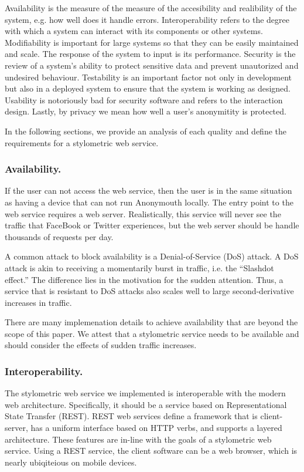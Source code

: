 \documentclass[letterpaper]{article}
\begin{document}
Availability is the measure of the measure of the accesibility and
realibility of the system, e.g. how well does it handle errors.
Interoperability refers to the degree with which a system can interact
with its components or other systems.  Modifiability is important for
large systems so that they can be easily maintained and scale.  The
response of the system to input is its performance.  Security is the
review of a system's ability to protect sensitive data and prevent
unautorized and undesired behaviour.  Testability is an important
factor not only in development but also in a deployed system to ensure
that the system is working as designed.  Usability is notoriously bad
for security software \cite{Whitten:1999:WJC:1251421.1251435} and
refers to the interaction design.  Lastly, by privacy we mean how well
a user's anonymitity is protected.

In the following sections, we provide an analysis of each quality and
define the requirements for a stylometric web service.


\subsubsection{Availability.}

If the user can not access the web service, then the user is in the
same situation as having a device that can not run Anonymouth
locally.  The entry point to the web service requires a web server.
Realistically, this service will never see the traffic that FaceBook
or Twitter experiences, but the web server should be handle thousands
of requests per day.

A common attack to block availability is a Denial-of-Service (DoS)
attack.  A DoS attack is akin to receiving a momentarily burst in
traffic, i.e. the ``Slashdot effect.''  The difference lies in the
motivation for the sudden attention.  Thus, a service that is
resistant to DoS attacks also scales well to large second-derivative
increases in traffic.

There are many implemenation details to achieve availability that are
beyond the scope of this paper.  We attest that a stylometric service
needs to be available and should consider the effects of sudden
traffic increases.

\subsubsection{Interoperability.}

The stylometric web service we implemented is interoperable with the modern
web architecture.  Specifically, it should be a service based on
Representational State Transfer (REST)\cite{Fielding2000}.  REST web
services define a framework that is client-server, has a uniform
interface based on HTTP verbs, and supports a layered architecture.
These features are in-line with the goals of a stylometric web
service.  Using a REST service, the client software can be a web
browser, which is nearly ubiqiteious on mobile devices.
\end{document}
